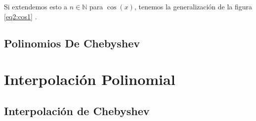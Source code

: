 \documentclass[14pt,letterpaper]{report}
\begin{document}
			Si extendemos esto a ${n\in\mathbb{N}}$ para ${\cos\left(x\right)}$,
			tenemos la generalización de la figura \ref{eq2:cos1}
			\cite{TRIGID:1}.

		\section{Polinomios De Chebyshev} %
			\blindtext

	\chapter{Interpolación Polinomial} %
		\section{Interpolación de Chebyshev} %

	\medskip

	\printbibliography[title={Referencias}]
	\printbibliography[keyword={YT},heading=subbibintoc,title={Videos de YouTube}]
	\printbibliography[keyword={Web},heading=subbibintoc,title={Páginas Web Y Artículos}]
\end{document}
